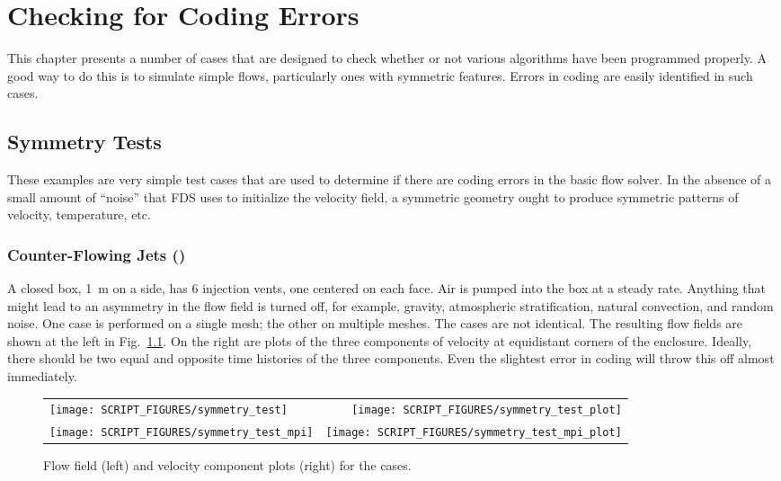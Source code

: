 \documentclass[11pt]{book}
\begin{document}
\label{geom_hrrpuv_init}
\label{geom_part_init}



\chapter{Checking for Coding Errors}

This chapter presents a number of cases that are designed to check whether or not various algorithms have been programmed properly. A good way to do this is to simulate simple flows, particularly ones with symmetric features. Errors in coding are easily identified in such cases.

\section{Symmetry Tests}

These examples are very simple test cases that are used to determine if there are coding errors in the basic flow solver. In the absence of a small amount of ``noise'' that FDS uses to initialize the velocity field, a symmetric geometry ought to produce symmetric patterns of velocity, temperature, etc.

\subsection{Counter-Flowing Jets (\texorpdfstring{}{symmetry\_test})}
\label{symmetry_test}
\label{symmetry_test_mpi}

A closed box, 1~m on a side, has 6 injection vents, one centered on each face. Air is pumped into the box at a steady rate. Anything that might lead to an asymmetry in the flow field is turned off, for example, gravity, atmospheric stratification, natural convection, and random noise. One case is performed on a single mesh; the other on multiple meshes. The cases are not identical. The resulting flow fields are shown at the left in Fig.~\ref{symmetry_test_fig}. On the right are plots of the three components of velocity at equidistant corners of the enclosure. Ideally, there should be two equal and opposite time histories of the three components. Even the slightest error in coding will throw this off almost immediately.

\begin{figure}[!ht]
\begin{tabular*}{\textwidth}{lr}
\texttt{[image: SCRIPT\_FIGURES/symmetry\_test]} &
\texttt{[image: SCRIPT\_FIGURES/symmetry\_test\_plot]} \\
\texttt{[image: SCRIPT\_FIGURES/symmetry\_test\_mpi]} &
\texttt{[image: SCRIPT\_FIGURES/symmetry\_test\_mpi\_plot]}
\end{tabular*}
\caption[The  cases]{Flow field (left) and velocity component plots (right) for the  cases.}
\label{symmetry_test_fig}
\end{figure}
\end{document}
